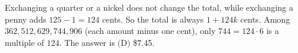 Exchanging a quarter or a nickel does not change the total, while exchanging a penny adds $125-1=124$ cents. So the total is always $1+124k$ cents. Among $362,512,629,744,906$ (each amount minus one cent), only $744=124\cdot6$ is a multiple of $124$. The answer is $\boxed{\text{(D)}}$ \$7.45.
